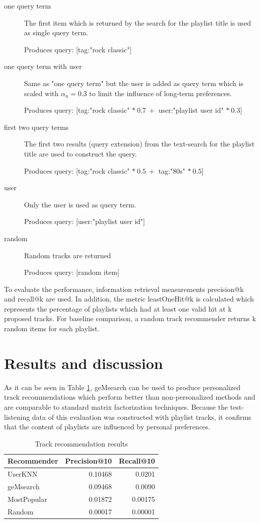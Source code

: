 \documentclass[sigconf]{acmart}
\begin{document}
\begin{description}
	\item[one query term] The first item which is returned by the search for the playlist title is used as single query term. 
	
	Produces query:	[tag:"rock classic"]
	\item[one query term with user] Same as "one query term" but the user is added as query term which is scaled with $ \alpha_{u} = 0.3 $ to limit the influence of long-term preferences.
	
	Produces query:	[tag:"rock classic" $ * \: 0.7 \: + $ user:"playlist user id" $ * \: 0.3 $]
	\item[first two query terms] The first two results (query extension) from the text-search for the playlist title are used to construct the query.
	
	Produces query:	[tag:"rock classic" $ * \: 0.5 \: + $ tag:"80s" $ * \: 0.5 $]
	\item[user] Only the user is used as query term.
	
	Produces query:	[user:"playlist user id"]
	\item[random] Random tracks are returned
	
	Produces query:	[random item]
\end{description}

\medskip
To evaluate the performance, information retrieval measurements precision@k and recall@k are used. In addition, the metric leastOneHit@k is calculated which represents the percentage of playlists which had at least one valid hit at k proposed tracks. For baseline comparison, a random track recommender returns k random items for each playlist.

\section{Results and discussion}
\label{sec:discussion}
As it can be seen in Table \ref{table:track_rec_results}, geMsearch can be used to produce personalized track recommendations which perform better than non-personalized methods and are comparable to standard matrix factorization techniques. Because the test-listening data of this evaluation was constructed with playlist tracks, it confirms that the content of playlists are influenced by personal preferences.

\begin{table}[H]
	\caption{Track recommendation results}
	\label{table:track_rec_results}
	\begin{tabular}{lrr}
		\midrule 
		\textbf{Recommender} & \textbf{Precision@10} & \textbf{Recall@10} \\ 
		\midrule 
		UserKNN   & 0.10468 & 0.0201  \\
		geMsearch   &  0.09468 &  0.0090  \\ %
		MostPopular   & 0.01872 & 0.00175  \\
		Random   & 0.00017 & 0.00001  \\
		\bottomrule
	\end{tabular}
\end{table}
\end{document}
